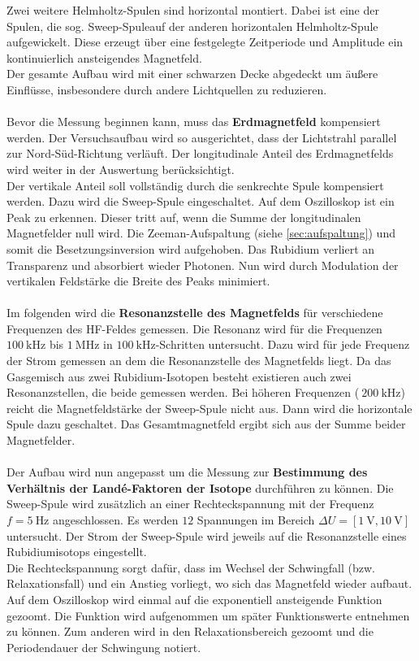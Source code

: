 Zwei weitere Helmholtz-Spulen sind horizontal montiert.
Dabei ist eine der Spulen, die sog. \glqq Sweep-Spule\grqq auf der anderen horizontalen Helmholtz-Spule aufgewickelt.
Diese erzeugt über eine festgelegte Zeitperiode und Amplitude ein kontinuierlich ansteigendes Magnetfeld.
\\
Der gesamte Aufbau wird mit einer schwarzen Decke abgedeckt um äußere Einflüsse, insbesondere durch andere Lichtquellen zu reduzieren.
\\
\\
Bevor die Messung beginnen kann, muss das \textbf{Erdmagnetfeld} kompensiert werden.
Der Versuchsaufbau wird so ausgerichtet, dass der Lichtstrahl parallel zur Nord-Süd-Richtung verläuft.
Der longitudinale Anteil des Erdmagnetfelds wird weiter in der Auswertung berücksichtigt.
\\
Der vertikale Anteil soll vollständig durch die senkrechte Spule kompensiert werden.
Dazu wird die Sweep-Spule eingeschaltet.
Auf dem Oszilloskop ist ein Peak zu erkennen.
Dieser tritt auf, wenn die Summe der longitudinalen Magnetfelder null wird.
Die Zeeman-Aufspaltung (siehe \autoref{sec:aufspaltung}) und somit die Besetzungsinversion wird aufgehoben.
Das Rubidium verliert an Transparenz und absorbiert wieder Photonen.
Nun wird durch Modulation der vertikalen Feldstärke die Breite des Peaks minimiert.
\\
\\
Im folgenden wird die \textbf{Resonanzstelle des Magnetfelds} für verschiedene Frequenzen des HF-Feldes gemessen.
Die Resonanz wird für die Frequenzen $\qty{100}{\kilo\hertz}$ bis $\qty{1}{\mega\hertz}$ in $\qty{100}{\kilo\hertz}$-Schritten untersucht.
Dazu wird für jede Frequenz der Strom gemessen an dem die Resonanzstelle des Magnetfelds liegt.
Da das Gasgemisch aus zwei Rubidium-Isotopen besteht existieren auch zwei Resonanzstellen, die beide gemessen werden.
Bei höheren Frequenzen ($~\qty{200}{\kilo\hertz}$) reicht die Magnetfeldstärke der Sweep-Spule nicht aus.
Dann wird die horizontale Spule dazu geschaltet.
Das Gesamtmagnetfeld ergibt sich aus der Summe beider Magnetfelder.
\\
\\
Der Aufbau wird nun angepasst um die Messung zur \textbf{Bestimmung des Verhältnis der Landé-Faktoren der Isotope} durchführen zu können.
Die Sweep-Spule wird zusätzlich an einer Rechteckspannung mit der Frequenz $f=\qty{5}{\hertz}$ angeschlossen.
Es werden $12$ Spannungen im Bereich $\Delta U = [\qty{1}{\volt}, \qty{10}{\volt}]$ untersucht.
Der Strom der Sweep-Spule wird jeweils auf die Resonanzstelle eines Rubidiumisotops eingestellt.
\\
Die Rechteckspannung sorgt dafür, dass im Wechsel der Schwingfall (bzw. Relaxationsfall) und ein Anstieg vorliegt, wo sich das Magnetfeld wieder aufbaut.
\\
Auf dem Oszilloskop wird einmal auf die exponentiell ansteigende Funktion gezoomt.
Die Funktion wird aufgenommen um später Funktionswerte entnehmen zu können.
Zum anderen wird in den Relaxationsbereich gezoomt und die Periodendauer der Schwingung notiert.